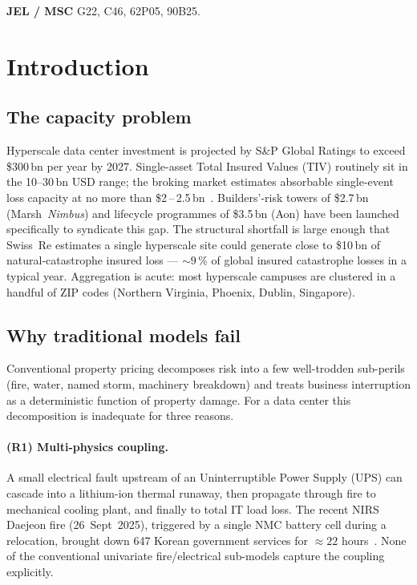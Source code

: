 \documentclass[11pt,a4paper]{article}
\let\origsection\section
\renewcommand{\section}{\clearpage\origsection}
\theoremstyle{ia}
\newcommand{\1}{\mathbf{1}}
\begin{document}
\par\vspace{3pt}
\noindent
{\sffamily\footnotesize\color{iadark}\textbf{JEL / MSC}}\quad
{\footnotesize G22, C46, 62P05, 90B25.}

\clearpage
\tableofcontents
\bigskip

\section{Introduction}\label{sec:intro}

\subsection{The capacity problem}

Hyperscale data center investment is projected by S\&P Global Ratings
to exceed \$300\,bn per year by 2027.
Single-asset Total Insured Values (TIV) routinely sit in the
\SIrange{10}{30}{}\,bn USD range; the broking market estimates
absorbable single-event loss capacity at no more than
\$2\,--\,2.5\,bn~\citep{ENR2025,Baldwin2025}. Builders'-risk towers
of \$2.7\,bn (Marsh~\emph{Nimbus}) and lifecycle programmes of
\$3.5\,bn (Aon) have been launched specifically to syndicate this
gap. The structural shortfall is large enough that Swiss~Re estimates
a single hyperscale site could generate close to \$10\,bn of
natural-catastrophe insured loss --- $\sim 9\,\%$ of global insured
catastrophe losses in a typical year. Aggregation is acute: most
hyperscale campuses are clustered in a handful of ZIP codes (Northern
Virginia, Phoenix, Dublin, Singapore).

\subsection{Why traditional models fail}\label{ss:whyfail}

Conventional property pricing decomposes risk into a few well-trodden
sub-perils (fire, water, named storm, machinery breakdown) and treats
business interruption as a deterministic function of property damage.
For a data center this decomposition is inadequate for three reasons.

\paragraph{(R1) Multi-physics coupling.} A small electrical fault
upstream of an Uninterruptible Power Supply (UPS) can cascade into a
lithium-ion thermal runaway, then propagate through fire to mechanical
cooling plant, and finally to total IT load loss. The recent NIRS
Daejeon fire (26~Sept~2025), triggered by a single NMC battery cell
during a relocation, brought down 647 Korean government services for
$\approx 22$ hours~\citep{NIRS2025}. None of the conventional univariate
fire/electrical sub-models capture the coupling explicitly.
\end{document}
